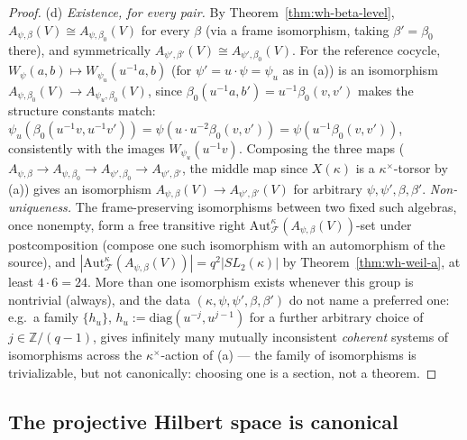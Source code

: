 \begin{proof}
(d) \emph{Existence, for every pair.} By Theorem~\ref{thm:wh-beta-level},
$A_{\psi,\beta}(V)\cong A_{\psi,\beta_0}(V)$ for every $\beta$ (via a frame
isomorphism, taking $\beta'=\beta_0$ there), and symmetrically
$A_{\psi',\beta'}(V)\cong A_{\psi',\beta_0}(V)$. For the reference cocycle,
$W_\psi(a,b)\mapsto W_{\psi_u}(u^{-1}a,b)$ (for $\psi'=u\cdot\psi=\psi_u$ as
in (a)) is an isomorphism $A_{\psi,\beta_0}(V)\to A_{\psi_u,\beta_0}(V)$,
since $\beta_0(u^{-1}a,b')=u^{-1}\beta_0(v,v')$ makes the structure
constants match: $\psi_u(\beta_0(u^{-1}v,u^{-1}v'))=\psi(u\cdot u^{-2}\beta_0(v,v'))=\psi(u^{-1}\beta_0(v,v'))$,
consistently with the images $W_{\psi_u}(u^{-1}v)$. Composing the three
maps ($A_{\psi,\beta}\to A_{\psi,\beta_0}\to A_{\psi',\beta_0}\to A_{\psi',\beta'}$,
the middle map since $X(\kappa)$ is a $\kappa^\times$-torsor by (a)) gives an
isomorphism $A_{\psi,\beta}(V)\to A_{\psi',\beta'}(V)$ for arbitrary
$\psi,\psi',\beta,\beta'$. \emph{Non-uniqueness.} The frame-preserving
isomorphisms between two fixed such algebras, once nonempty, form a free
transitive right $\mathrm{Aut}_{\mathcal{F}}^\kappa(A_{\psi,\beta}(V))$-set
under postcomposition (compose one such isomorphism with an automorphism of
the source), and $|\mathrm{Aut}_{\mathcal{F}}^\kappa(A_{\psi,\beta}(V))|=q^2|SL_2(\kappa)|$
by Theorem~\ref{thm:wh-weil-a}, at least $4\cdot 6=24$. More than one
isomorphism exists whenever this group is nontrivial (always), and the data
$(\kappa,\psi,\psi',\beta,\beta')$ do not name a preferred one: e.g.\ a
family $\{h_u\}$, $h_u:=\mathrm{diag}(u^{-j},u^{j-1})$ for a further
arbitrary choice of $j\in\mathbb{Z}/(q-1)$, gives infinitely many mutually
inconsistent \emph{coherent} systems of isomorphisms across the
$\kappa^\times$-action of (a) — the family of isomorphisms is trivializable,
but not canonically: choosing one is a section, not a theorem.
\end{proof}

\subsection{The projective Hilbert space is canonical}

